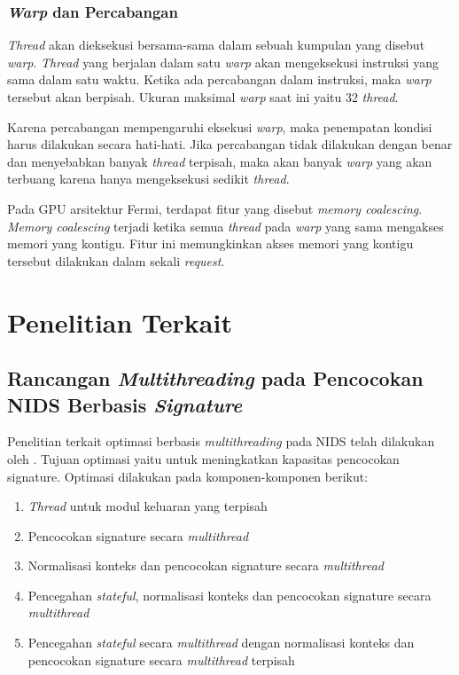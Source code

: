     \subsubsection{\emph{Warp} dan Percabangan}

      \emph{Thread} akan dieksekusi bersama-sama dalam sebuah kumpulan yang disebut \emph{warp}. \emph{Thread} yang berjalan dalam satu \emph{warp} akan mengeksekusi instruksi yang sama dalam satu waktu. Ketika ada percabangan dalam instruksi, maka \emph{warp} tersebut akan berpisah. Ukuran maksimal \emph{warp} saat ini yaitu 32 \emph{thread}.

      Karena percabangan mempengaruhi eksekusi \emph{warp}, maka penempatan kondisi harus dilakukan secara hati-hati. Jika percabangan tidak dilakukan dengan benar dan menyebabkan banyak \emph{thread} terpisah, maka akan banyak \emph{warp} yang akan terbuang karena hanya mengeksekusi sedikit \emph{thread}.
      
      Pada GPU arsitektur Fermi, terdapat fitur yang disebut \emph{memory coalescing}. \emph{Memory coalescing} terjadi ketika semua \emph{thread} pada \emph{warp} yang sama mengakses memori yang kontigu. Fitur ini memungkinkan akses memori yang kontigu tersebut dilakukan dalam sekali \emph{request}.

\section{Penelitian Terkait}

  \subsection{Rancangan \emph{Multithreading} pada Pencocokan NIDS Berbasis \emph{Signature}} 

    Penelitian terkait optimasi berbasis \emph{multithreading} pada NIDS telah dilakukan oleh \citep{multi2004}. Tujuan optimasi yaitu untuk meningkatkan kapasitas pencocokan signature. Optimasi dilakukan pada komponen-komponen berikut:

    \begin{enumerate}
      \item \emph{Thread} untuk modul keluaran yang terpisah
      \item Pencocokan signature secara \emph{multithread}
      \item Normalisasi konteks dan pencocokan signature secara \emph{multithread}
      \item Pencegahan \emph{stateful}, normalisasi konteks dan pencocokan signature secara \emph{multithread}
      \item Pencegahan \emph{stateful} secara \emph{multithread} dengan normalisasi konteks dan pencocokan signature secara \emph{multithread} terpisah
    \end{enumerate}

